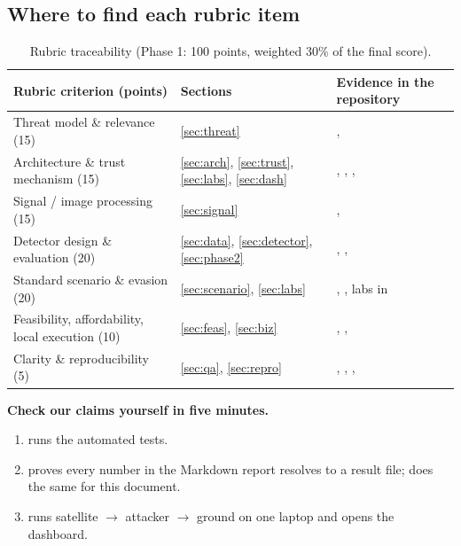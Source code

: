 \subsection{Where to find each rubric item}
\begin{table}[!htbp]
\centering\small
\begin{tabularx}{\textwidth}{|L{5.4cm}|L{2.6cm}|Y|}
\hline
\textbf{Rubric criterion (points)} & \textbf{Sections} & \textbf{Evidence in the repository}\\
\hline
Threat model \& relevance (15) & \ref{sec:threat} & , \\
\hline
Architecture \& trust mechanism (15) & \ref{sec:arch}, \ref{sec:trust}, \ref{sec:labs}, \ref{sec:dash} & , , , \\
\hline
Signal / image processing (15) & \ref{sec:signal} & , \\
\hline
Detector design \& evaluation (20) & \ref{sec:data}, \ref{sec:detector}, \ref{sec:phase2} & , , \\
\hline
Standard scenario \& evasion (20) & \ref{sec:scenario}, \ref{sec:labs} & , , labs in \\
\hline
Feasibility, affordability, local execution (10) & \ref{sec:feas}, \ref{sec:biz} & , , \\
\hline
Clarity \& reproducibility (5) & \ref{sec:qa}, \ref{sec:repro} & , , , \\
\hline
\end{tabularx}
\caption{Rubric traceability (Phase 1: 100 points, weighted 30\% of the final score).}
\end{table}

\textbf{Check our claims yourself in five minutes.}
\begin{enumerate}[label=(\arabic*)]
  \item {} runs the automated tests.
  \item {} proves every number in the Markdown report resolves to a result file;  does the same for this document.
  \item {} runs satellite $\to$ attacker $\to$ ground on one laptop and opens the dashboard.
\end{enumerate}
